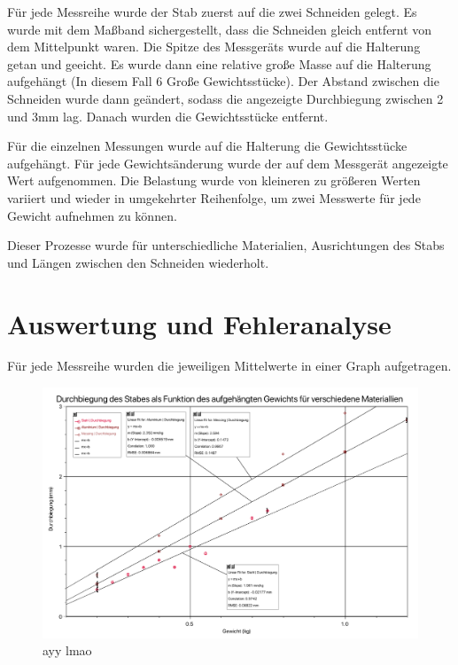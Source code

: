 \documentclass[11pt,a4paper]{article}
\begin{document}
Für jede Messreihe wurde der Stab zuerst auf die zwei Schneiden gelegt. Es wurde mit dem Maßband sichergestellt, dass die Schneiden gleich entfernt von dem Mittelpunkt waren. Die Spitze des Messgeräts wurde auf die Halterung getan und geeicht. Es wurde dann eine relative große Masse auf die Halterung aufgehängt (In diesem Fall 6 Große Gewichtsstücke). Der Abstand zwischen die Schneiden wurde dann geändert, sodass die angezeigte Durchbiegung zwischen 2 und 3mm lag. Danach wurden die Gewichtsstücke entfernt. 

Für die einzelnen Messungen wurde auf die Halterung die Gewichtsstücke aufgehängt. Für jede Gewichtsänderung wurde der auf dem Messgerät angezeigte Wert aufgenommen. Die Belastung wurde von kleineren zu größeren Werten variiert und wieder in umgekehrter Reihenfolge, um zwei Messwerte für jede Gewicht aufnehmen zu können. 

Dieser Prozesse wurde für unterschiedliche Materialien, Ausrichtungen des Stabs und  Längen zwischen den Schneiden wiederholt. 






\section{Auswertung und Fehleranalyse}
Für jede Messreihe wurden die jeweiligen Mittelwerte in einer Graph aufgetragen. 

\begin{figure}
	\centering
	\includegraphics[width=\linewidth]{Abb2}
	\caption{ayy lmao}
\end{figure}
\end{document}
